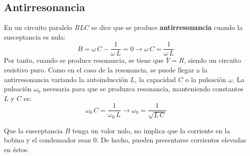 \documentclass[11pt]{book} %
\begin{document}
	\subsection{Antirresonancia}
	En un circuito paralelo $RLC$ se dice que se produce \textbf{antirresonancia} cuando la susceptancia es nula:
	\begin{equation*}
		B=\omega\,C-\dfrac{1}{\omega\,L}=0\rightarrow \omega\,C=\dfrac{1}{\omega\,L}
	\end{equation*}
	Por tanto, cuando se produce resonancia, se tiene que $\overline{Y}=R$, siendo un circuito resistivo puro. Como en el caso de la resonancia, se puede llegar a la antirresonancia variando la autoinducción $L$, la capacidad $C$ o la pulsación $\omega$. La pulsación $\omega_0$ necesaria para que se produzca resonancia, manteniendo constantes $L$ y $C$ es:
	\begin{equation}
		\omega_0\,C=\dfrac{1}{\omega_0\,L}\rightarrow \boxed{\omega_0=\dfrac{1}{\sqrt{L\,C}}}
	\end{equation}
	\begin{remark}
		Que la susceptancia $B$ tenga un valor nulo, no implica que la corriente en la bobina y el condensador sean 0. De hecho, pueden presentarse corrientes elevadas en éstos.
	\end{remark}
	
\end{document}
